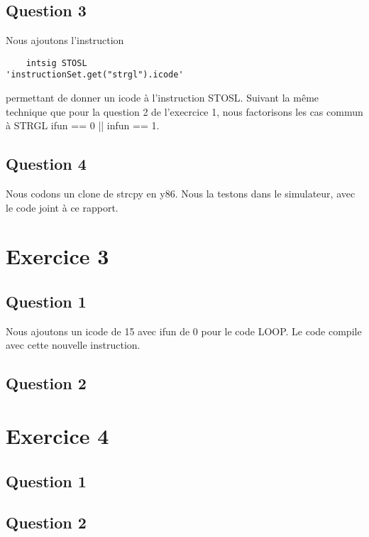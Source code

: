 \documentclass[a4paper,10pt]{article}
\begin{document}
\subsection{Question 3}
Nous ajoutons l'instruction
\begin{verbatim}
    intsig STOSL                     'instructionSet.get("strgl").icode'
\end{verbatim}
permettant de donner un icode à l'instruction STOSL. Suivant la même technique que pour la question 2 de l'execrcice 1, nous factorisons les cas commun à STRGL ifun == 0 || infun == 1.

\subsection{Question 4}
Nous codons un clone de strcpy en y86. Nous la testons dans le simulateur, avec le code joint à ce rapport.

\section{Exercice 3}
\subsection{Question 1}
Nous ajoutons un icode de 15 avec ifun de 0 pour le code LOOP. Le code compile avec cette nouvelle instruction.

\subsection{Question 2}

\section{Exercice 4}
\subsection{Question 1}

\subsection{Question 2}
\end{document}
